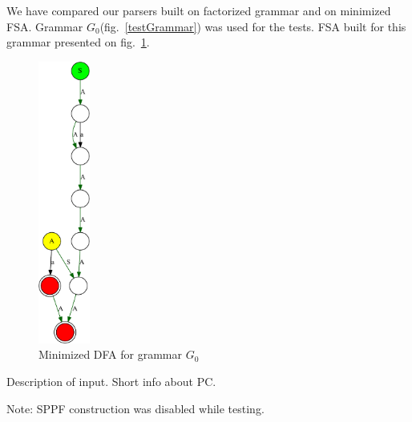 \documentclass[runningheads,a4paper]{llncs}
\begin{document}
We have compared our parsers built on factorized grammar and on minimized FSA.
Grammar $G_0$(fig.~\ref{testGrammar}) was used for the tests.
FSA built for this grammar presented on fig.~\ref{dfa}.

\begin{figure}
\centering
\includegraphics[width=0.15\textwidth]{pictures/minimizedDFA.pdf}
\caption{\label{dfa}Minimized DFA for grammar $G_0$}
\end{figure}

Description of input. 
Short info about PC.

Note: SPPF construction was disabled while testing.
\end{document}

